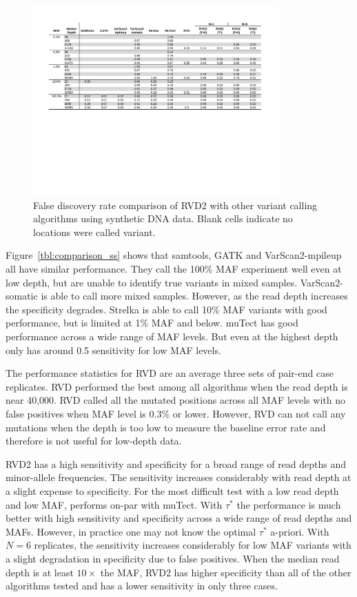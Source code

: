 \documentclass{bioinfo}
\begin{document}
\begin{figure}[!tbhp]
\centering
\includegraphics[width=0.84\textwidth]{pdf_figs/comparison_table_fdr.pdf}
\caption{False discovery rate comparison of RVD2 with other variant calling algorithms using synthetic DNA data. Blank cells indicate no locations were called variant.}
\vspace{-15pt}
\label{tbl:comparison_fdr}
\end{figure}

Figure~\ref{tbl:comparison_ss} shows that samtools, GATK and VarScan2-mpileup all have similar performance. They call the 100\% MAF experiment well even at low depth, but are unable to identify true variants in mixed samples. VarScan2-somatic is able to call more mixed samples. However, as the read depth increases the specificity degrades. Strelka is able to call 10\% MAF variants with good performance, but is limited at 1\% MAF and below. muTect has good performance across a wide range of MAF levels. But even at the highest depth only has around 0.5 sensitivity for low MAF levels.

The performance statistics for RVD are an average three sets of pair-end case replicates. RVD performed the best among all algorithms when the read depth is near 40,000. RVD called all the mutated positions across all MAF levels with no false positives when MAF level is 0.3\% or lower. However, RVD can not call any mutations when the depth is too low to measure the baseline error rate and therefore is not useful for low-depth data.

RVD2 has a high sensitivity and specificity for a broad range of read depths and minor-allele frequencies.  The sensitivity increases considerably with read depth at a slight expense to specificity. For the most difficult test with a low read depth and low MAF, performs on-par with muTect. With $\tau^*$ the performance is much better with high sensitivity and specificity across a wide range of read depths and MAFs. However, in practice one may not know the optimal $\tau^*$ a-priori. With $N=6$ replicates, the sensitivity increases considerably for low MAF variants with a slight degradation in specificity due to false positives. When the median read depth is at least $10\times$ the MAF, RVD2 has higher specificity than all of the other algorithms tested and has a lower sensitivity in only three cases.
\end{document}
